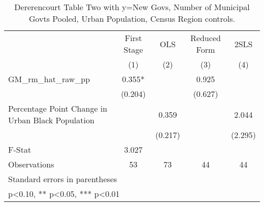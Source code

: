 \begin{table}[htbp]\centering
\def\sym#1{\ifmmode^{#1}\else\(^{#1}\)\fi}
\caption{Dererencourt Table Two with y=New Govs, Number of Municipal Govts  Pooled, Urban Population, Census Region controls.}
\begin{tabular}{l*{4}{c}}
\toprule
                    & First Stage   &         OLS   &Reduced Form   &        2SLS   \\
                    &\multicolumn{1}{c}{(1)}   &\multicolumn{1}{c}{(2)}   &\multicolumn{1}{c}{(3)}   &\multicolumn{1}{c}{(4)}   \\
\midrule
GM\_rm\_hat\_raw\_pp    &       0.355*  &               &       0.925   &               \\
                    &     (0.204)   &               &     (0.627)   &               \\
\addlinespace
Percentage Point Change in Urban Black Population&               &       0.359   &               &       2.044   \\
                    &               &     (0.217)   &               &     (2.295)   \\
\midrule
F-Stat              &       3.027   &               &               &               \\
Observations        &          53   &          73   &          44   &          44   \\
\bottomrule
\multicolumn{5}{l}{\footnotesize Standard errors in parentheses}\\
\multicolumn{5}{l}{\footnotesize * p<0.10, ** p<0.05, *** p<0.01}\\
\end{tabular}
\end{table}
